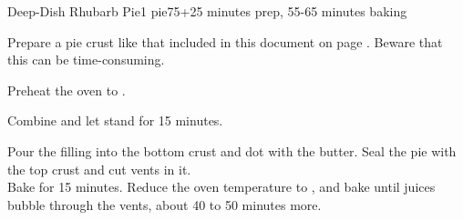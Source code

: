 \documentclass[../Cookbook.tex]{subfiles}
\begin{document}
\begin{recipe}{Deep-Dish Rhubarb Pie}{1 pie}{75+25 minutes prep, 55-65 minutes baking}

	Prepare a pie crust like that included in this document on page \pageref{PieCrust}. Beware that this can be time-consuming.

	\newstep
	Preheat the oven to .

	Combine and let stand for 15 minutes.

	Pour the filling into the bottom crust and dot with the butter. Seal the pie with the top crust and cut vents in it.\\
	Bake for 15 minutes.
	Reduce the oven temperature to , and bake until juices bubble through the vents, about 40 to 50 minutes more.

\end{recipe}
\end{document}
